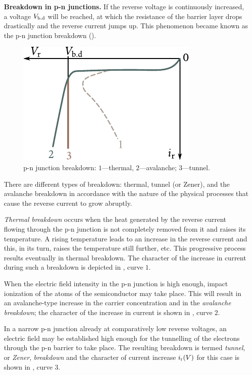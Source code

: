 \textbf{Breakdown in p-n junctions.} If the reverse voltage is continuously increased, a voltage $V_{\text{b.d}}$ will be reached, at which the resistance of the barrier layer drops drastically and the reverse current jumps up. This phenomenon became known as the p-n junction breakdown ().

\begin{figure}[t]
	\begin{center}
		\includegraphics[scale=1.0]{figures/ch_08/fig_8_16.pdf}
		\caption[]{p-n junction breakdown: $1$---thermal, $2$---avalanche; $3$---tunnel.}
		\label{fig:8_16}
	\end{center}
	\vspace{-0.8cm}
\end{figure}

There are different types of breakdown: thermal, tunnel (or Zener), and the avalanche breakdown in accordance with the nature of the physical processes that cause the reverse current to grow abruptly.

\textit{Thermal breakdown} occurs when the heat generated by the reverse current flowing through the p-n junction is not completely removed from it and raises its temperature. A rising temperature leads to an increase in the reverse current and this, in its turn, raises the temperature still further, etc. This progressive process results eventually in thermal breakdown. The character of the increase in current during such a breakdown is depicted in , curve $1$.

When the electric field intensity in the p-n junction is high enough, impact ionization of the atoms of the semiconductor may take place. This will result in an avalanche-type increase in the carrier concentration and in the \textit{avalanche breakdown}; the character of the increase in current is shown in , curve $2$.

In a narrow p-n junction already at comparatively low reverse voltages, an electric field may be established high enough for the tunnelling of the electrons through the p-n barrier to take place. The resulting breakdown is termed \textit{tunnel}, or \textit{Zener}, \textit{breakdown} and the character of current increase $i_{\text{r}}(V)$ for this case is shown in , curve $3$.

